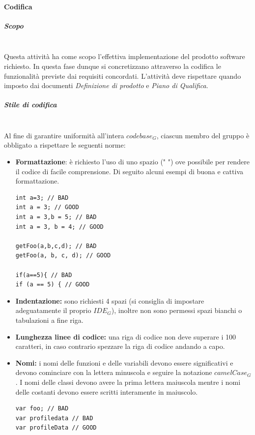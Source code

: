 		\paragraph{Codifica}
			\subparagraph{Scopo} \mbox{} \\
			Questa attività ha come scopo l'effettiva implementazione del prodotto software richiesto. In questa fase dunque si concretizzano attraverso la codifica le funzionalità previste dai requisiti concordati.
			L'attività deve rispettare quando imposto dai documenti \textit{Definizione di prodotto} e \textit{Piano di Qualifica}.
			\subparagraph{Stile di codifica} \mbox{} \\
			Al fine di garantire uniformità all'intera $codebase_G$, ciascun membro del gruppo è obbligato a rispettare le seguenti norme:
			\begin{itemize}
			\item \textbf{Formattazione}: è richiesto l'uso di uno spazio (" ") ove possibile per rendere il codice di facile comprensione.
			Di seguito alcuni  esempi di buona e cattiva formattazione.
\begin{lstlisting}
int a=3; // BAD
int a = 3; // GOOD
int a = 3,b = 5; // BAD
int a = 3, b = 4; // GOOD

getFoo(a,b,c,d); // BAD
getFoo(a, b, c, d); // GOOD

if(a==5){ // BAD
if (a == 5) { // GOOD
\end{lstlisting}
			
			\item \textbf{Indentazione:} sono richiesti 4 spazi (si consiglia di impostare adeguatamente il proprio $IDE_G$), inoltre non sono permessi spazi bianchi o tabulazioni a fine riga.
			
			\item \textbf{Lunghezza linee di codice:} una riga di codice non deve superare i 100 caratteri, in caso contrario spezzare la riga di codice andando a capo.
			
			\item \textbf{Nomi:} i nomi delle funzioni e delle variabili devono essere significativi e devono cominciare con la lettera minuscola e seguire la notazione $camelCase_G$. I nomi delle classi devono avere la prima lettera maiuscola mentre i nomi delle costanti devono essere scritti interamente in maiuscolo.
\begin{lstlisting}
var foo; // BAD
var profiledata // BAD
var profileData // GOOD
\end{lstlisting}
			

\end{itemize}
